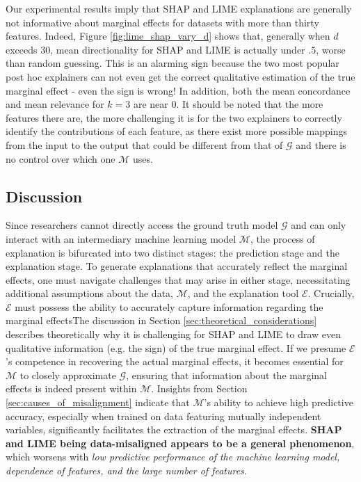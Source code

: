 \documentclass[mnsc,blindrev]{informs3}
\newcommand{\mG}{\mathcal{G}}
\newcommand{\mM}{\mathcal{M}}
\begin{document}
    
    Our experimental results imply that SHAP and LIME explanations are generally not informative about marginal effects for datasets with more than thirty features. Indeed, Figure \ref{fig:lime_shap_vary_d} shows that, generally when $d$ exceeds $30$, mean directionality for SHAP and LIME is actually under $.5$, worse than random guessing. This is an alarming sign because the two most popular post hoc explainers can not even get the correct qualitative estimation of the true marginal effect - even the sign is wrong! In addition, both the mean concordance and mean relevance for $k=3$ are near $0$. It should be noted that the more features there are, the more challenging it is for the two explainers to correctly identify the contributions of each feature, as there exist more possible mappings from the input to the output that could be different from that of $\mG$ and there is no control over which one $\mM$ uses.

    
    \subsection{Discussion}
            Since researchers cannot directly access the ground truth model $\mathcal{G}$ and can only interact with an intermediary machine learning model $\mathcal{M}$, the process of explanation is bifurcated into two distinct stages: the prediction stage and the explanation stage. To generate explanations that accurately reflect the marginal effects, one must navigate challenges that may arise in either stage, necessitating additional assumptions about the data, $\mathcal{M}$, and the explanation tool $\mathcal{E}$. Crucially, $\mathcal{E}$ must possess the ability to accurately capture information regarding the marginal effectsThe discussion in Section \ref{sec:theoretical_considerations} describes theoretically why it is challenging for SHAP and LIME to draw even qualitative information (e.g. the sign) of the true marginal effect. If we presume $\mathcal{E}$'s competence in recovering the actual marginal effects, it becomes essential for $\mathcal{M}$ to closely approximate $\mathcal{G}$, ensuring that information about the marginal effects is indeed present within $\mathcal{M}$. Insights from Section \ref{sec:causes_of_misalignment} indicate that $\mathcal{M}$'s ability to achieve high predictive accuracy, especially when trained on data featuring mutually independent variables, significantly facilitates the extraction of the marginal effects.       \textbf{SHAP and LIME being data-misaligned appears to be a general phenomenon}, which worsens with \textit{low predictive performance of the machine learning model, dependence of features, and the large number of features}. 
\end{document}
